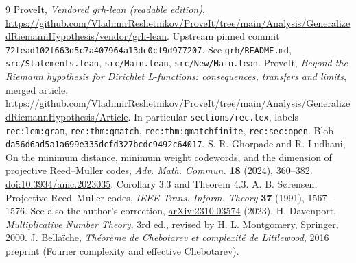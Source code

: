 \documentclass[11pt]{article}
\theoremstyle{remark}\newtheorem{remark}[theorem]{Remark}
\begin{document}
\begin{thebibliography}{9}
 ProveIt, \emph{Vendored grh-lean (readable edition)}, \url{https://github.com/VladimirReshetnikov/ProveIt/tree/main/Analysis/GeneralizedRiemannHypothesis/vendor/grh-lean}. Upstream pinned commit \texttt{72fead102f663d5c7a407}\allowbreak\texttt{964a13dc0cf9d977207}. See \texttt{grh/README.md}, \texttt{src/Statements.lean}, \texttt{src/Main.lean}, \texttt{src/New/Main.lean}.
 ProveIt, \emph{Beyond the Riemann hypothesis for Dirichlet L-functions: consequences, transfers and limits}, merged article, \url{https://github.com/VladimirReshetnikov/ProveIt/tree/main/Analysis/GeneralizedRiemannHypothesis/Article}. In particular \texttt{sections/rec.tex}, labels \texttt{rec:lem:gram}, \texttt{rec:thm:qmatch}, \texttt{rec:thm:qmatchfinite}, \texttt{rec:sec:open}. Blob \texttt{da56d6ad5a1a699e335dcfd327bcdc9492c64017}.
 S. R. Ghorpade and R. Ludhani, On the minimum distance, minimum weight codewords, and the dimension of projective Reed--Muller codes, \emph{Adv. Math. Commun.} \textbf{18} (2024), 360--382. \href{https://doi.org/10.3934/amc.2023035}{doi:10.3934/amc.2023035}. Corollary 3.3 and Theorem 4.3.
 A. B. S\o rensen, Projective Reed--Muller codes, \emph{IEEE Trans. Inform. Theory} \textbf{37} (1991), 1567--1576. See also the author's correction, \href{https://arxiv.org/abs/2310.03574}{arXiv:2310.03574} (2023).
 H. Davenport, \emph{Multiplicative Number Theory}, 3rd ed., revised by H. L. Montgomery, Springer, 2000.
 J. Bella\"iche, \emph{Th\'eor\`eme de Chebotarev et complexit\'e de Littlewood}, 2016 preprint (Fourier complexity and effective Chebotarev).
\end{thebibliography}
\end{document}
